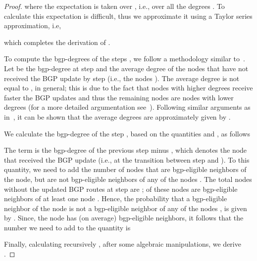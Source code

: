 \begin{proof}
where the expectation is taken over , i.e., over all the degrees . To calculate this expectation is difficult, thus we approximate it using a Taylor series approximation, i.e, 

which completes the derivation of .

To compute the bgp-degrees  of the steps , we follow a methodology similar to~\cite{pavlos-conf-model}. Let  be the bgp-degree at step  and  the average degree of the nodes that have not received the BGP update by step   (i.e., the nodes ). The average degree  is not equal to , in general; this is due to the fact that nodes with higher degrees receive faster the BGP updates and thus the remaining nodes are nodes with lower degrees (for a more detailed argumentation see~\cite{pavlos-conf-model}). Following similar arguments as in~\cite{pavlos-conf-model}, it can be shown that the average degrees  are approximately given by .

We calculate the bgp-degree of the step , based on the quantities  and , as follows

The term  is the bgp-degree of the previous step minus , which denotes the  node that received the BGP update (i.e., at the transition between step  and ). To this quantity, we need to add the number of nodes that are bgp-eligible neighbors of the  node, but are not bgp-eligible neighbors of any of the nodes . The total nodes without the updated BGP routes at step  are ;  of these nodes are bgp-eligible neighbors of at least one node . Hence, the probability that a bgp-eligible neighbor of the  node is not a bgp-eligible neighbor of any of the nodes , is given by . Since, the  node has (on average)  bgp-eligible neighbors, it follows that the number we need to add to the quantity  is 
 

Finally, calculating recursively , after some algebraic manipulations, we derive . 

\end{proof}